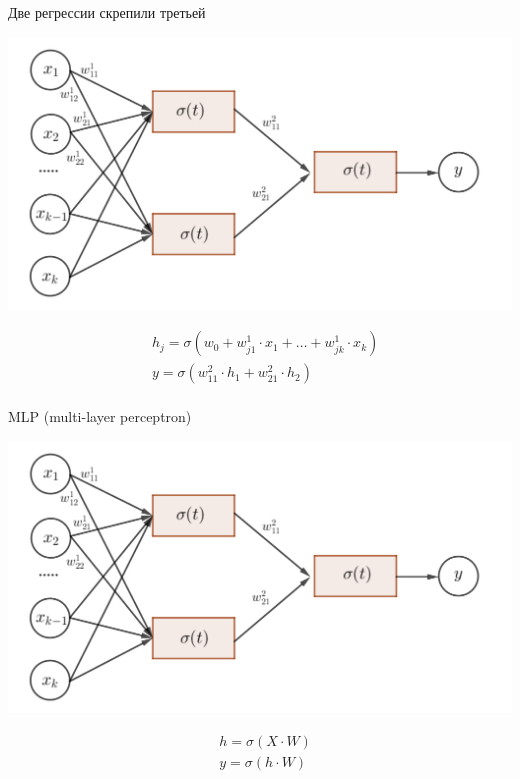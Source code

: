 \documentclass[notes,12pt, aspectratio=169]{beamer}
\begin{document}
\begin{frame}{Две регрессии скрепили третьей}
	\begin{center}
		\includegraphics[width=0.7\paperwidth]{neuron_4.png}
	\end{center}
	\begin{equation*}
		\begin{aligned}
		& h_j = \sigma(w_0 + w_{j1}^1 \cdot x_1 + \ldots + w_{jk}^1 \cdot x_k)\\
		& y = \sigma(w_{11}^2 \cdot h_1 + w_{21}^2 \cdot h_2) \\
		\end{aligned}
	\end{equation*}
\end{frame}


\begin{frame}{MLP (multi-layer perceptron)}
	\begin{center}
		\includegraphics[width=0.7\paperwidth]{neuron_4.png}
	\end{center}
	\begin{equation*}
		\begin{aligned}
		&h = \sigma(X \cdot W) \\
		&y = \sigma(h \cdot W) \\
		\end{aligned}
	\end{equation*}
\end{frame}
\end{document}
